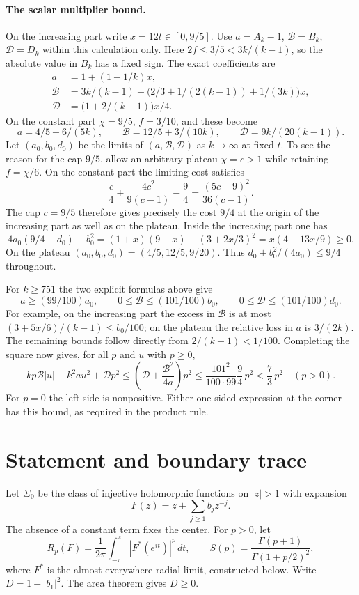 \documentclass[11pt]{article}
\begin{document}
	\paragraph{The scalar multiplier bound.}
	On the increasing part write $x=12t\in[0,9/5]$. Use
	$a=A_k-1$, $\mathcal B=B_k$, $\mathcal D=D_k$ within this calculation only.
	Here $2f\leq3/5<3k/(k-1)$, so the absolute value in $B_k$ has a fixed
	sign. The exact coefficients are
	\[
	\begin{aligned}
		a&=1+(1-1/k)x,\\
		\mathcal B&=3k/(k-1)+\bigl(2/3+1/(2(k-1))+1/(3k)\bigr)x,\\
		\mathcal D&=\bigl(1+2/(k-1)\bigr)x/4 .
	\end{aligned}
	\]
	On the constant part $\chi=9/5$, $f=3/10$, and these become
	\[
	a=4/5-6/(5k),\qquad \mathcal B=12/5+3/(10k),\qquad
	\mathcal D=9k/(20(k-1)).
	\]
	Let $(a_0,b_0,d_0)$ be the limits of $(a,\mathcal B,\mathcal D)$
	as $k\to\infty$ at fixed $t$.
	To see the reason for the cap $9/5$, allow an arbitrary plateau
	$\chi=c>1$ while retaining $f=\chi/6$. On the constant part the
	limiting cost satisfies
	\[
	\frac c4+\frac{4c^2}{9(c-1)}-\frac94
	=\frac{(5c-9)^2}{36(c-1)} .
	\]
	The cap $c=9/5$ therefore gives precisely the cost $9/4$ at the
	origin of the increasing part as well as on the plateau.
	Inside the increasing part one has
	\[
	4a_0(9/4-d_0)-b_0^2
	=(1+x)(9-x)-(3+2x/3)^2
	=x(4-13x/9)\geq0 .
	\]
	On the plateau $(a_0,b_0,d_0)=(4/5,12/5,9/20)$. Thus $d_0+b_0^2/(4a_0)\leq9/4$ throughout.
	
	For $k\geq751$ the two explicit formulas above give
	\[
	a\geq(99/100)a_0,\qquad
	0\leq \mathcal B\leq(101/100)b_0,\qquad
	0\leq \mathcal D\leq(101/100)d_0 .
	\]
	For example, on the increasing part the excess in $\mathcal B$ is at most
	$(3+5x/6)/(k-1)\leq b_0/100$; on the plateau the relative loss
	in $a$ is $3/(2k)$. The remaining bounds follow directly from
	$2/(k-1)<1/100$. Completing the square now gives, for all $p$ and $u$
	with $p\geq0$,
	\[
	kp \mathcal B |u|-k^2a u^2+\mathcal D p^2
	\leq \left(\mathcal D+\frac{\mathcal B^2}{4a}\right)p^2
	\leq \frac{101^2}{100\cdot99}\frac94\,p^2
	< \frac73\,p^2\quad (p>0).
	\]
	For $p=0$ the left side is nonpositive. Either one-sided expression
	at the corner has this bound, as required in the product rule.
	
	\section{Statement and boundary trace}
	Let $\Sigma_0$ be the class of injective holomorphic functions on $|z|>1$ with expansion
	\begin{equation}\label{eq:F}
		F(z)=z+\sum_{j\ge1}b_jz^{-j}.
	\end{equation}
	The absence of a constant term fixes the center. For $p>0$, let
	\[
	R_p(F)=\frac1{2\pi}\int_{-\pi}^{\pi}|F^*(e^{it})|^p\,dt,
	\qquad S(p)=\frac{\Gamma(p+1)}{\Gamma(1+p/2)^2},
	\]
	where $F^*$ is the almost-everywhere radial limit, constructed below. Write
	$D=1-|b_1|^2$. The area theorem gives $D\ge0$.
	
\end{document}
